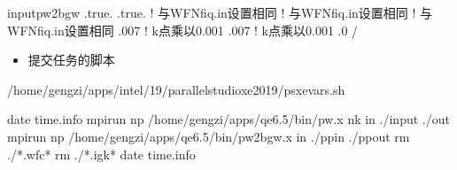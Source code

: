 \documentclass[a4paper,12pt,english]{sphinxmanual}
\begin{document}
\begin{sphinxVerbatim}[commandchars=\\\{\}]
input\PYGZus{}pw2bgw
     
     
     .true.
     
     .true.
                 ! 与WFN\PYGZus{}fiq.in设置相同
                 ! 与WFN\PYGZus{}fiq.in设置相同
                 ! 与WFN\PYGZus{}fiq.in设置相同
     .007        ! k点乘以0.001
     .007        ! k点乘以0.001
     .0
/
\end{sphinxVerbatim}
\begin{itemize}
\item {} 
\sphinxAtStartPar
提交任务的脚本

\end{itemize}

\begin{sphinxVerbatim}[commandchars=\\\{\}]


 
 /home/gengzi/apps/intel/19/parallel\PYGZus{}studio\PYGZus{}xe\PYGZus{}2019/psxevars.sh

date  \PYGZgt{}\PYGZgt{} time.info
mpirun \PYGZhy{}np  /home/gengzi/apps/qe\PYGZhy{}6.5/bin/pw.x \PYGZhy{}nk   \PYGZhy{}in ./input \PYGZgt{} ./out
mpirun \PYGZhy{}np  /home/gengzi/apps/qe\PYGZhy{}6.5/bin/pw2bgw.x \PYGZhy{}in ./pp\PYGZus{}in \PYGZgt{} ./pp\PYGZus{}out
rm ./*.wfc*
rm ./*.igk*
date  \PYGZgt{}\PYGZgt{} time.info
\end{sphinxVerbatim}
\end{document}
